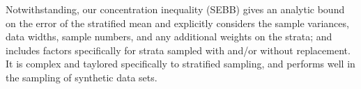 Notwithstanding, our concentration inequality (SEBB) gives an analytic bound on the error of the stratified mean and explicitly considers the sample variances, data widths, sample numbers, and any additional weights on the strata; and includes factors specifically for strata sampled with and/or without replacement.
It is complex and taylored specifically to stratified sampling, and performs well in the sampling of synthetic data sets.























